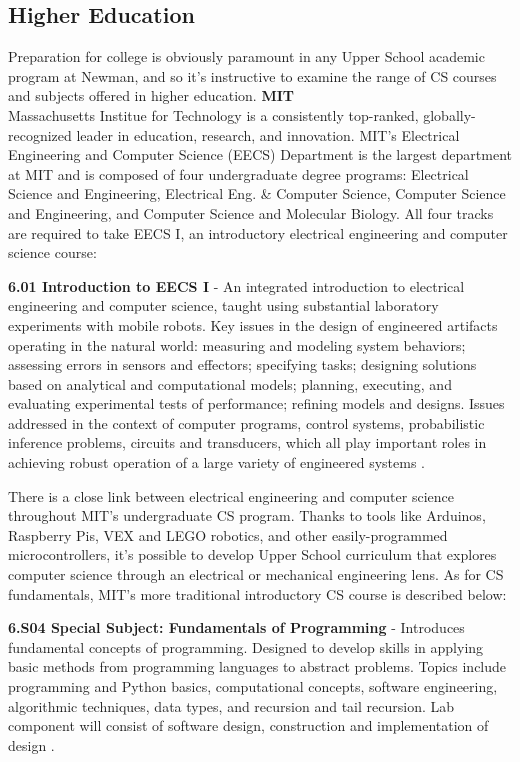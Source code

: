 \subsection{Higher Education}
Preparation for college is obviously paramount in any Upper School academic program at Newman, and so it's instructive to examine the range of CS courses and subjects offered in higher education. 
\textbf{MIT} \\
Massachusetts Institue for Technology is a consistently top-ranked, globally-recognized leader in education, research, and innovation. MIT's Electrical Engineering and Computer Science (EECS) Department is the largest department at MIT and is composed of four undergraduate degree programs: Electrical Science and Engineering, Electrical Eng. & Computer Science, Computer Science and Engineering, and Computer Science and Molecular Biology. All four tracks are required to take EECS I, an introductory electrical engineering and computer science course:
\begin{blockquote}
\textbf{6.01 Introduction to EECS I} - An integrated introduction to electrical engineering and computer science, taught using substantial laboratory experiments with mobile robots. Key issues in the design of engineered artifacts operating in the natural world: measuring and modeling system behaviors; assessing errors in sensors and effectors; specifying tasks; designing solutions based on analytical and computational models; planning, executing, and evaluating experimental tests of performance; refining models and designs. Issues addressed in the context of computer programs, control systems, probabilistic inference problems, circuits and transducers, which all play important roles in achieving robust operation of a large variety of engineered systems \cite{mit}.
\end{blockquote}
There is a close link between electrical engineering and computer science throughout MIT's undergraduate CS program. Thanks to tools like Arduinos, Raspberry Pis, VEX and LEGO robotics, and other easily-programmed microcontrollers, it's possible to develop Upper School curriculum that explores computer science through an electrical or mechanical engineering lens. As for CS fundamentals, MIT's more traditional introductory CS course is described below:
\begin{blockquote}
	\textbf{6.S04 Special Subject: Fundamentals of Programming} - Introduces fundamental concepts of programming. Designed to develop skills in applying basic methods from programming languages to abstract problems. Topics include programming and Python basics, computational concepts, software engineering, algorithmic techniques, data types, and recursion and tail recursion. Lab component will consist of software design, construction and implementation of design \cite{mit}. 
	\end{blockquote} \par
